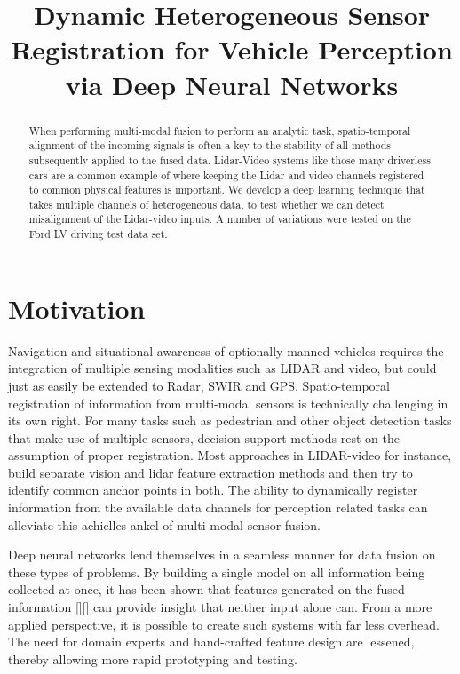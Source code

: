 \documentclass{article}
\title{Dynamic Heterogeneous Sensor Registration for Vehicle Perception via Deep Neural Networks}
\begin{document}

\maketitle

\begin{abstract}
When performing multi-modal fusion to perform an analytic task, spatio-temporal alignment of the incoming signals is often a key to the stability of all methods subsequently applied to the fused data. Lidar-Video systems like those many driverless cars are a common example of where keeping the Lidar and video channels registered to common physical features is important. We develop a deep learning technique that takes multiple channels of heterogeneous data, to test whether we can detect misalignment of the Lidar-video inputs.  A number of variations were tested on the Ford LV driving test data set. 

\end{abstract}

\section{Motivation}
Navigation and situational awareness of optionally manned vehicles requires the integration of multiple sensing modalities such as LIDAR and video, but could just as easily be extended to  Radar, SWIR and GPS. Spatio-temporal registration of information from multi-modal sensors is technically challenging in its own right. For many tasks such as pedestrian and other object detection tasks that make use of multiple sensors, decision support methods rest on the assumption of proper registration. Most approaches in LIDAR-video for instance, build separate vision and lidar feature extraction methods and then try to identify common anchor points in both. The ability to dynamically register information from the available data channels for perception related tasks can alleviate this achielles ankel of multi-modal sensor fusion.

Deep neural networks lend themselves in a seamless manner for data fusion on these types of problems. By building a single model on all information being collected at once, it has been shown that features generated on the fused information [][] can provide insight that neither input alone can. From a more applied perspective, it is possible to create such systems with far less overhead. The need for domain experts and hand-crafted feature design are lessened, thereby allowing more rapid prototyping and testing. 
\end{document}
